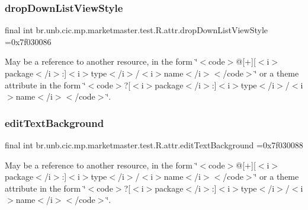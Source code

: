 \subsubsection{\texorpdfstring{drop\+Down\+List\+View\+Style}{dropDownListViewStyle}}
{\footnotesize\ttfamily final int br.\+unb.\+cic.\+mp.\+marketmaster.\+test.\+R.\+attr.\+drop\+Down\+List\+View\+Style =0x7f030086\hspace{0.3cm}{\ttfamily [static]}}

May be a reference to another resource, in the form \char`\"{}$<$code$>$@\mbox{[}+\mbox{]}\mbox{[}$<$i$>$package$<$/i$>$\+:\mbox{]}$<$i$>$type$<$/i$>$/$<$i$>$name$<$/i$>$$<$/code$>$\char`\"{} or a theme attribute in the form \char`\"{}$<$code$>$?\mbox{[}$<$i$>$package$<$/i$>$\+:\mbox{]}$<$i$>$type$<$/i$>$/$<$i$>$name$<$/i$>$$<$/code$>$\char`\"{}. \mbox{\label{classbr_1_1unb_1_1cic_1_1mp_1_1marketmaster_1_1test_1_1R_1_1attr_a131f347662c0637b8a889b4761544f3a}} 
\subsubsection{\texorpdfstring{edit\+Text\+Background}{editTextBackground}}
{\footnotesize\ttfamily final int br.\+unb.\+cic.\+mp.\+marketmaster.\+test.\+R.\+attr.\+edit\+Text\+Background =0x7f030088\hspace{0.3cm}{\ttfamily [static]}}

May be a reference to another resource, in the form \char`\"{}$<$code$>$@\mbox{[}+\mbox{]}\mbox{[}$<$i$>$package$<$/i$>$\+:\mbox{]}$<$i$>$type$<$/i$>$/$<$i$>$name$<$/i$>$$<$/code$>$\char`\"{} or a theme attribute in the form \char`\"{}$<$code$>$?\mbox{[}$<$i$>$package$<$/i$>$\+:\mbox{]}$<$i$>$type$<$/i$>$/$<$i$>$name$<$/i$>$$<$/code$>$\char`\"{}. \mbox{\label{classbr_1_1unb_1_1cic_1_1mp_1_1marketmaster_1_1test_1_1R_1_1attr_a51e896505dd649e14584d278b1a96e8c}} 
